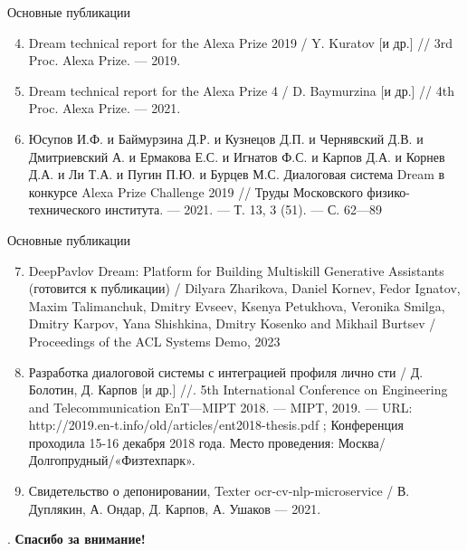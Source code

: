 \begin{frame}{Основные публикации}
\begin{enumerate}
\setcounter{enumi}{3}
\item Dream technical report for the Alexa Prize 2019 / Y. Kuratov
[и др.] // 3rd Proc. Alexa Prize. — 2019.
\item Dream technical report for the Alexa Prize 4  / D. Baymurzina
[и др.] // 4th Proc. Alexa Prize. — 2021.
\item Юсупов И.Ф. и Баймурзина Д.Р. и Кузнецов Д.П. и Чернявский Д.В. и Дмитриевский А. и Ермакова Е.С. и Игнатов Ф.С. и Карпов Д.А. и Корнев Д.А. и Ли Т.А. и Пугин П.Ю. и Бурцев М.С. Диалоговая система Dream в конкурсе Alexa
Prize Challenge 2019 // Труды Московского физико-технического
института. — 2021. — Т. 13, 3 (51). — С. 62—89
\end{enumerate}
\end{frame}
\begin{frame}{Основные публикации}
\begin{enumerate}
\setcounter{enumi}{6}
\item DeepPavlov Dream: Platform for Building Multiskill Generative Assistants (готовится к публикации) / Dilyara Zharikova, Daniel Kornev, Fedor Ignatov, Maxim Talimanchuk, Dmitry Evseev, Ksenya Petukhova, Veronika Smilga, Dmitry Karpov, Yana Shishkina, Dmitry Kosenko and Mikhail Burtsev / Proceedings of the ACL Systems Demo, 2023
\item Разработка диалоговой системы с интеграцией профиля лично
сти  / Д. Болотин, Д. Карпов [и др.] //. 5th International Conference
on Engineering and Telecommunication EnT—MIPT 2018. — MIPT,
2019. — URL: http://2019.en-t.info/old/articles/ent2018-thesis.pdf ;
Конференция проходила 15-16 декабря 2018 года. Место проведения:
Москва/Долгопрудный/«Физтехпарк».
\item Свидетельство о депонировании, Texter ocr-cv-nlp-microservice / В. Дуплякин, А. Ондар, Д. Карпов, А. Ушаков — 2021.
\end{enumerate}    
\end{frame}

\begin{frame}{.}
\centering
\Large \textbf{Спасибо за внимание!}
\end{frame}


